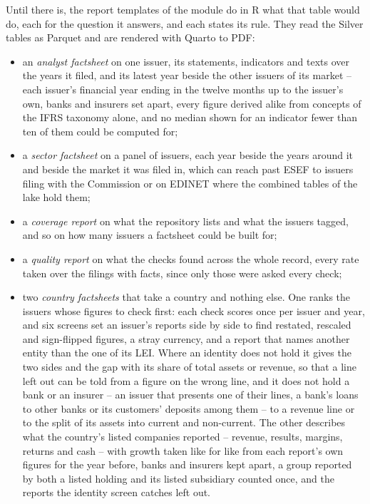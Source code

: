 Until there is, the report templates of the module do in R what that table would do, each for the question it answers, and each states its rule. They read the Silver tables as Parquet and are rendered with Quarto to PDF:
\begin{itemize}
	\item an \emph{analyst factsheet} on one issuer, its statements, indicators and texts over the years it filed, and its latest year beside the other issuers of its market -- each issuer's financial year ending in the twelve months up to the issuer's own, banks and insurers set apart, every figure derived alike from concepts of the IFRS taxonomy alone, and no median shown for an indicator fewer than ten of them could be computed for;
	\item a \emph{sector factsheet} on a panel of issuers, each year beside the years around it and beside the market it was filed in, which can reach past ESEF to issuers filing with the Commission or on EDINET where the combined tables of the lake hold them;
	\item a \emph{coverage report} on what the repository lists and what the issuers tagged, and so on how many issuers a factsheet could be built for;
	\item a \emph{quality report} on what the checks found across the whole record, every rate taken over the filings with facts, since only those were asked every check;
	\item two \emph{country factsheets} that take a country and nothing else. One ranks the issuers whose figures to check first: each check scores once per issuer and year, and six screens set an issuer's reports side by side to find restated, rescaled and sign-flipped figures, a stray currency, and a report that names another entity than the one of its LEI. Where an identity does not hold it gives the two sides and the gap with its share of total assets or revenue, so that a line left out can be told from a figure on the wrong line, and it does not hold a bank or an insurer -- an issuer that presents one of their lines, a bank's loans to other banks or its customers' deposits among them -- to a revenue line or to the split of its assets into current and non-current. The other describes what the country's listed companies reported -- revenue, results, margins, returns and cash -- with growth taken like for like from each report's own figures for the year before, banks and insurers kept apart, a group reported by both a listed holding and its listed subsidiary counted once, and the reports the identity screen catches left out.
\end{itemize}
